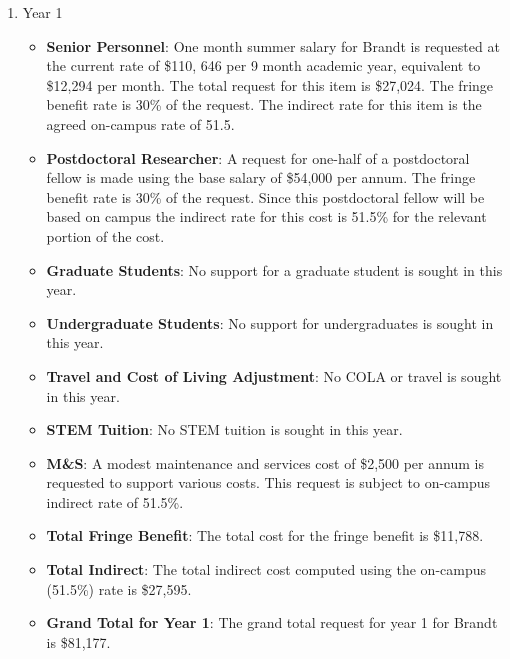 \begin{enumerate}

\item{Year 1}
\begin{itemize}[noitemsep,nolistsep]
\item{{\bf Senior Personnel}: One month summer salary for Brandt is requested at the current rate of \$110, 646 per 9 month academic year, equivalent to \$12,294 per month.  The total request for this item is \$27,024. The fringe benefit rate is 30\% of the request.  The indirect rate for this item is the agreed on-campus rate of 51.5.}

\item {{\bf Postdoctoral Researcher}: A request for one-half of a postdoctoral fellow is made using the base salary of \$54,000 per annum.  The fringe benefit rate is 30\% of the request.  Since this postdoctoral fellow will be based on campus the indirect rate for this cost is 51.5\% for the relevant portion of the cost. } 

\item{{\bf Graduate Students}: No support for a graduate student is sought in this year. }

\item {{\bf Undergraduate Students}: No support for undergraduates is sought in this year.}

\item{{\bf Travel and Cost of Living Adjustment}: No COLA or travel is sought in this year.}

\item {{\bf STEM Tuition}: No STEM tuition is sought in this year.}

\item {{\bf M\&S}: A modest maintenance and services cost of \$2,500 per annum is requested to support various costs.   This request is subject to on-campus indirect rate of 51.5\%.}

\item {{\bf Total Fringe Benefit}: The total cost for the fringe benefit is \$11,788.}

\item {{\bf Total Indirect}: The total indirect cost computed using the on-campus (51.5\%) rate is \$27,595.}

\item {{\bf Grand Total for Year 1}: The grand total request for year 1 for Brandt is \$81,177.}

\end{itemize}


\end{enumerate}
